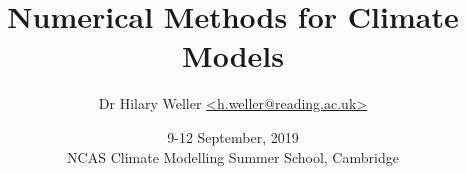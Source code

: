 
\title{Numerical Methods for Climate Models}

\author{Dr Hilary Weller \url{<h.weller@reading.ac.uk>}\\
}

\date{9-12 September, 2019\\
\vspace{1cm}
NCAS Climate Modelling Summer School, Cambridge}\maketitle


